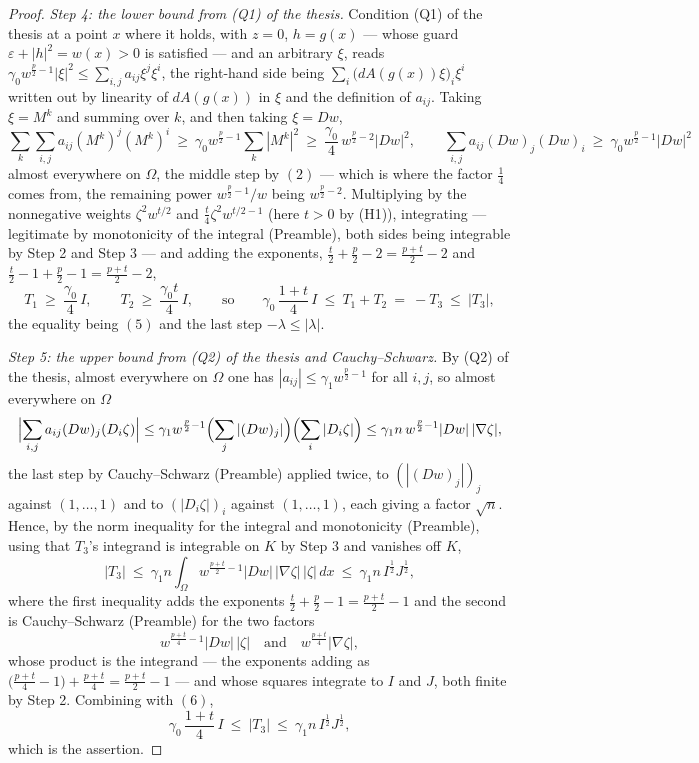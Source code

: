 \begin{proof}
\emph{Step 4: the lower bound from (Q1) of the thesis.}  Condition (Q1) of the thesis at a
point $x$ where it holds, with $z=0$, $h=g(x)$ --- whose guard
$\varepsilon+|h|^2=w(x)>0$ is satisfied --- and an arbitrary $\xi$, reads
$\gamma_0w^{\frac p2-1}|\xi|^2\le\sum_{i,j}a_{ij}\xi^j\xi^i$, the right-hand
side being $\sum_i\bigl(dA(g(x))\xi\bigr)_i\xi^i$ written out by linearity of
$dA(g(x))$ in $\xi$ and the definition of $a_{ij}$.  Taking $\xi=M^k$ and
summing over $k$, and then taking $\xi=Dw$,
\[
\sum_k\sum_{i,j}a_{ij}(M^k)^j(M^k)^i\ \ge\ \gamma_0w^{\frac p2-1}\sum_k|M^k|^2
\ \ge\ \frac{\gamma_0}4\,w^{\frac p2-2}|Dw|^2 ,
\qquad
\sum_{i,j}a_{ij}(Dw)_j(Dw)_i\ \ge\ \gamma_0w^{\frac p2-1}|Dw|^2
\]
almost everywhere on $\Omega$, the middle step by $(2)$ --- which is where the
factor $\tfrac14$ comes from, the remaining power $w^{\frac p2-1}/w$ being
$w^{\frac p2-2}$.  Multiplying by the nonnegative weights $\zeta^2w^{t/2}$ and
$\tfrac t4\zeta^2w^{t/2-1}$ (here $t>0$ by (H1)), integrating --- legitimate by
monotonicity of the integral (Preamble), both sides being integrable by Step 2
and Step 3 --- and adding the exponents, $\tfrac t2+\tfrac p2-2=\tfrac{p+t}2-2$
and $\tfrac t2-1+\tfrac p2-1=\tfrac{p+t}2-2$,
\[
T_1\ \ge\ \frac{\gamma_0}4\,I,
\qquad
T_2\ \ge\ \frac{\gamma_0t}4\,I,
\qquad\text{so}\qquad
\gamma_0\,\frac{1+t}4\,I\ \le\ T_1+T_2\ =\ -T_3\ \le\ |T_3| ,
\tag{6}
\]
the equality being $(5)$ and the last step $-\lambda\le|\lambda|$.

\emph{Step 5: the upper bound from (Q2) of the thesis and Cauchy--Schwarz.}  By
(Q2) of the thesis, almost everywhere on $\Omega$ one has
$|a_{ij}|\le\gamma_1w^{\frac p2-1}$ for all $i,j$, so almost everywhere on
$\Omega$
\[
\Bigl|\sum_{i,j}a_{ij}(Dw)_j(D_i\zeta)\Bigr|
\le\gamma_1w^{\frac p2-1}\Bigl(\sum_j|(Dw)_j|\Bigr)\Bigl(\sum_i|D_i\zeta|\Bigr)
\le\gamma_1n\,w^{\frac p2-1}|Dw|\,|\nabla\zeta| ,
\]
the last step by Cauchy--Schwarz (Preamble) applied twice, to
$(|(Dw)_j|)_j$ against $(1,\dots,1)$ and to $(|D_i\zeta|)_i$ against
$(1,\dots,1)$, each giving a factor $\sqrt n$.  Hence, by the norm inequality
for the integral and monotonicity (Preamble), using that $T_3$'s integrand is
integrable on $K$ by Step 3 and vanishes off $K$,
\[
|T_3|\ \le\ \gamma_1n\int_\Omega w^{\frac{p+t}2-1}|Dw|\,|\nabla\zeta|\,|\zeta|\,dx
\ \le\ \gamma_1n\,I^{\frac12}J^{\frac12},
\]
where the first inequality adds the exponents
$\tfrac t2+\tfrac p2-1=\tfrac{p+t}2-1$ and the second is Cauchy--Schwarz
(Preamble) for the two factors
\[
w^{\frac{p+t}4-1}|Dw|\,|\zeta|
\quad\text{and}\quad
w^{\frac{p+t}4}|\nabla\zeta| ,
\]
whose product is the integrand --- the exponents adding as
$\bigl(\tfrac{p+t}4-1\bigr)+\tfrac{p+t}4=\tfrac{p+t}2-1$ --- and whose squares
integrate to $I$ and $J$, both finite by Step 2.  Combining with $(6)$,
\[
\gamma_0\,\frac{1+t}4\,I\ \le\ |T_3|\ \le\ \gamma_1n\,I^{\frac12}J^{\frac12},
\]
which is the assertion.
\end{proof}
